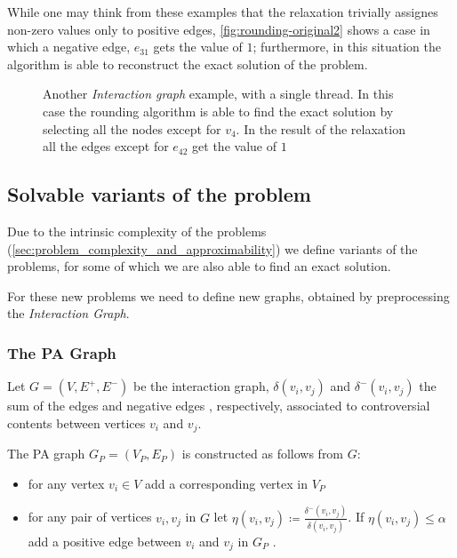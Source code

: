 While one may think from these examples that the relaxation trivially assignes
non-zero values only to positive edges, \autoref{fig:rounding-original2} shows
a case in which a negative edge, $e_{31}$ gets the value of $1$; furthermore,
in this situation the algorithm is able to reconstruct the exact solution of the problem.

\begin{figure}
	\centering
	\caption[Example of rounding algorithm finding the exact solution]{Another \emph{Interaction graph} example, with a single thread. In
		this case the rounding algorithm is able to find the exact solution by
		selecting all the nodes except for $v_4$. In the result of the
		relaxation all the edges except for $e_{42}$ get the value of $1$}%
	\label{fig:rounding-original2}
\end{figure}

\subsection{Solvable variants of the problem}%
\label{sub:solvable_variants_of_the_problem}

Due to the intrinsic complexity of the problems
(\autoref{sec:problem_complexity_and_approximability}) we define variants of
the problems, for some of which we are also able to find an exact solution.

For these new problems we need to define new graphs, obtained by preprocessing
the \emph{Interaction Graph}.

\subsubsection{The \acrlong{PA} Graph}%
\label{sub:pa-graph}

Let $G = (V, E^{+}, E^{-})$ be the interaction graph, $\delta(v_{i}, v_{j})$ and
$\delta^{-} (v_{i}, v_{j})$ the sum of the edges and negative edges , respectively,
associated to controversial contents between vertices $v_{i} $ and $v_{j} $.

\bigskip

The \acrfull{PA} graph $G_P = (V_{P}, E_{P}) $ is constructed as follows from
$G$:

\begin{itemize}
	\item for any vertex $v_{i} \in V$ add a corresponding vertex in $V_{P} $
	\item for any pair of vertices $v_i, v_j$ in $G$ let $\eta(v_i,v_j)
		      \coloneqq \frac{\delta^{-} (v_i,v_j)}{\delta (v_i,v_j)} $. If
	      $\eta(v_i,v_j) \leq \alpha $ add a positive edge between $v_{i} $ and
	      $v_{j} $ in $G_{P} $ \footnotemark.
\end{itemize}

